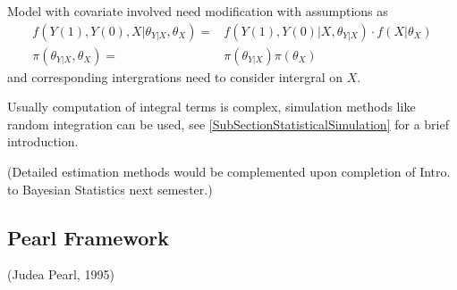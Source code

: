     Model with covariate involved need modification with assumptions as
    \begin{align*}
        f\left(Y(1),Y(0),X|\theta _{Y|X},\theta _{X}\right) =& f\left(Y(1),Y(0)|X,\theta _{Y|X}\right) \cdot f\left(X|\theta _X\right)\\
        \pi(\theta _{Y|X},\theta _{X})=&\pi(\theta _{Y|X})\pi(\theta _X)
    \end{align*}
    and corresponding intergrations need to consider intergral on $ X $.

    Usually computation of integral terms is complex, simulation methods like random integration can be used, see \autoref{SubSectionStatisticalSimulation} for a brief introduction.

    (Detailed estimation methods would be complemented upon completion of Intro. to Bayesian Statistics next semester.)
    
    
    


 





    
    
    
    
    
    
    
    
    

    























\subsection{Pearl Framework}
 (Judea Pearl, 1995)

